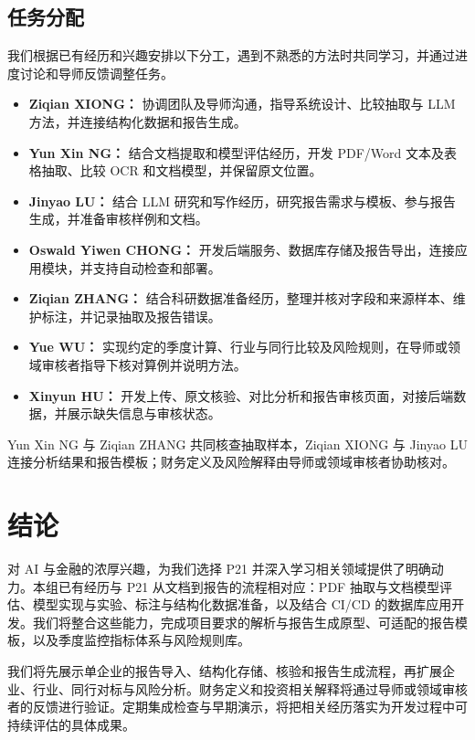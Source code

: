 \documentclass[a4paper,12pt]{article}
\begin{document}
\clearpage

\subsection{任务分配}
我们根据已有经历和兴趣安排以下分工，遇到不熟悉的方法时共同学习，并通过进度讨论和导师反馈调整任务。
\begin{itemize}
  \item \textbf{Ziqian XIONG：} 协调团队及导师沟通，指导系统设计、比较抽取与 LLM 方法，并连接结构化数据和报告生成。
  \item \textbf{Yun Xin NG：} 结合文档提取和模型评估经历，开发 PDF/Word 文本及表格抽取、比较 OCR 和文档模型，并保留原文位置。
  \item \textbf{Jinyao LU：} 结合 LLM 研究和写作经历，研究报告需求与模板、参与报告生成，并准备审核样例和文档。
  \item \textbf{Oswald Yiwen CHONG：} 开发后端服务、数据库存储及报告导出，连接应用模块，并支持自动检查和部署。
  \item \textbf{Ziqian ZHANG：} 结合科研数据准备经历，整理并核对字段和来源样本、维护标注，并记录抽取及报告错误。
  \item \textbf{Yue WU：} 实现约定的季度计算、行业与同行比较及风险规则，在导师或领域审核者指导下核对算例并说明方法。
  \item \textbf{Xinyun HU：} 开发上传、原文核验、对比分析和报告审核页面，对接后端数据，并展示缺失信息与审核状态。
\end{itemize}

Yun Xin NG 与 Ziqian ZHANG 共同核查抽取样本，Ziqian XIONG 与 Jinyao LU 连接分析结果和报告模板；财务定义及风险解释由导师或领域审核者协助核对。

\clearpage
\section{结论}
对 AI 与金融的浓厚兴趣，为我们选择 P21 并深入学习相关领域提供了明确动力。本组已有经历与 P21 从文档到报告的流程相对应：PDF 抽取与文档模型评估、模型实现与实验、标注与结构化数据准备，以及结合 CI/CD 的数据库应用开发。我们将整合这些能力，完成项目要求的解析与报告生成原型、可适配的报告模板，以及季度监控指标体系与风险规则库。

我们将先展示单企业的报告导入、结构化存储、核验和报告生成流程，再扩展企业、行业、同行对标与风险分析。财务定义和投资相关解释将通过导师或领域审核者的反馈进行验证。定期集成检查与早期演示，将把相关经历落实为开发过程中可持续评估的具体成果。
\end{document}
